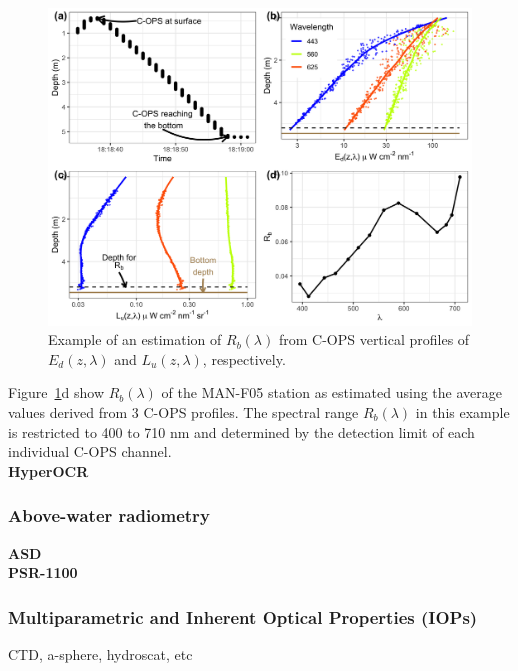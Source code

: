 \documentclass[essd, manuscript]{copernicus}
\begin{document}
\begin{figure}
    \centering
    \includegraphics[width=18cm]{Figures/Fig_Rb.png}
    \caption{Example of an estimation of $R_b(\lambda)$  from C-OPS vertical profiles of $E_d(z,\lambda)$ and $L_u(z,\lambda)$, respectively.   }
    \label{fig:Rb}
\end{figure}
Figure~\ref{fig:Rb}d show $R_b(\lambda)$ of the MAN-F05 station as estimated using the average values derived from 3 C-OPS profiles. The spectral range $R_b(\lambda)$ in this example is restricted to 400 to 710 nm and determined by the detection limit of each individual C-OPS channel.\\       

\textbf{HyperOCR}\\

\subsubsection{Above-water radiometry}

\textbf{ASD}\\

\textbf{PSR-1100}\\

\subsubsection{Multiparametric and Inherent Optical Properties (IOPs)}
CTD, a-sphere, hydroscat, etc
\end{document}
